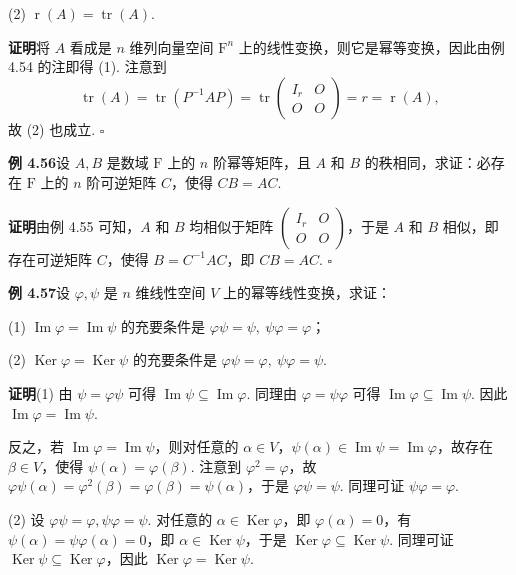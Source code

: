 \documentclass[UTF8,12pt,a4paper,fontset=fandol]{ctexart}
\begin{document}
(2) $\operatorname{r}(A)=\operatorname{tr}(A)$.

\noindent\textbf{证明}\quad 将 $A$ 看成是 $n$ 维列向量空间 $\mathrm{F}^n$ 上的线性变换，则它是幂等变换，因此由例 4.54 的注即得 (1). 注意到
\[
\operatorname{tr}(A)=\operatorname{tr}(P^{-1}AP)=\operatorname{tr}\left(\begin{array}{cc}
I_r & O\\
O & O
\end{array}\right)=r=\operatorname{r}(A),
\]
故 (2) 也成立. $\square$

\noindent\textbf{例 4.56}\quad 设 $A,B$ 是数域 $\mathrm{F}$ 上的 $n$ 阶幂等矩阵，且 $A$ 和 $B$ 的秩相同，求证：必存在 $\mathrm{F}$ 上的 $n$ 阶可逆矩阵 $C$，使得 $CB=AC$.

\noindent\textbf{证明}\quad 由例 4.55 可知，$A$ 和 $B$ 均相似于矩阵 $\left(\begin{array}{cc}I_r&O\\O&O\end{array}\right)$，于是 $A$ 和 $B$ 相似，即存在可逆矩阵 $C$，使得 $B=C^{-1}AC$，即 $CB=AC$. $\square$

\noindent\textbf{例 4.57}\quad 设 $\varphi,\psi$ 是 $n$ 维线性空间 $V$ 上的幂等线性变换，求证：

(1) $\operatorname{Im}\varphi=\operatorname{Im}\psi$ 的充要条件是 $\varphi\psi=\psi,\ \psi\varphi=\varphi$；

(2) $\operatorname{Ker}\varphi=\operatorname{Ker}\psi$ 的充要条件是 $\varphi\psi=\varphi,\ \psi\varphi=\psi$.

\noindent\textbf{证明}\quad (1) 由 $\psi=\varphi\psi$ 可得 $\operatorname{Im}\psi\subseteq\operatorname{Im}\varphi$. 同理由 $\varphi=\psi\varphi$ 可得 $\operatorname{Im}\varphi\subseteq\operatorname{Im}\psi$. 因此 $\operatorname{Im}\varphi=\operatorname{Im}\psi$.

反之，若 $\operatorname{Im}\varphi=\operatorname{Im}\psi$，则对任意的 $\alpha\in V$，$\psi(\alpha)\in\operatorname{Im}\psi=\operatorname{Im}\varphi$，故存在 $\beta\in V$，使得 $\psi(\alpha)=\varphi(\beta)$. 注意到 $\varphi^2=\varphi$，故 $\varphi\psi(\alpha)=\varphi^2(\beta)=\varphi(\beta)=\psi(\alpha)$，于是 $\varphi\psi=\psi$. 同理可证 $\psi\varphi=\varphi$.

(2) 设 $\varphi\psi=\varphi,\psi\varphi=\psi$. 对任意的 $\alpha\in\operatorname{Ker}\varphi$，即 $\varphi(\alpha)=0$，有 $\psi(\alpha)=\psi\varphi(\alpha)=0$，即 $\alpha\in\operatorname{Ker}\psi$，于是 $\operatorname{Ker}\varphi\subseteq\operatorname{Ker}\psi$. 同理可证 $\operatorname{Ker}\psi\subseteq\operatorname{Ker}\varphi$，因此 $\operatorname{Ker}\varphi=\operatorname{Ker}\psi$.
\end{document}
